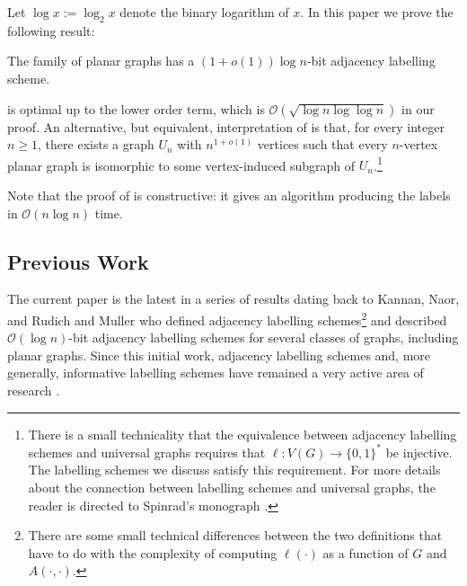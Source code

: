 \documentclass[kpfonts]{patmorin}
\newcommand{\Oh}{\mathcal{O}}
\let\ge\geqslant
\begin{document}
Let $\log x:=\log_2 x$ denote the binary logarithm of $x$.
In this paper we prove the following result:
\begin{thm}
  The family of planar graphs has a $(1+o(1))\log n$-bit adjacency labelling scheme.
\end{thm}


 is optimal up to the lower order term,
which is $\Oh\left(\sqrt{\log n\log\log n}\right)$ in our proof.
An alternative, but equivalent, interpretation of  is that, for every integer $n\ge 1$, there exists a graph $U_n$ with $n^{1+o(1)}$  vertices such that every $n$-vertex planar graph is isomorphic to some vertex-induced subgraph of $U_n$.\footnote{There is a small technicality that the equivalence between adjacency labelling schemes and universal graphs requires that $\ell:V(G)\to\{0,1\}^*$ be injective.  The labelling schemes we discuss satisfy this requirement.  For more details about the connection between labelling schemes and universal graphs, the reader is directed to Spinrad's monograph \cite[Section~2.1]{spinrad:efficient}.}

Note that the proof of  is constructive: it gives an algorithm producing the labels in $\Oh(n\log n)$ time.

\subsection{Previous Work}

The current paper is the latest in a series of results dating back to Kannan, Naor, and Rudich \cite{kannan.naor.ea:implicit0,kannan.naor.ea:implicit} and Muller \cite{muller:local} who defined adjacency labelling schemes\footnote{There are some small technical differences between the two definitions that have to do with the complexity of computing $\ell(\cdot)$ as a function of $G$ and
$A(\cdot,\cdot)$.} and described $\Oh(\log n)$-bit adjacency labelling schemes for several classes of graphs, including planar graphs.  Since this initial work, adjacency labelling schemes and, more generally, informative labelling schemes have remained a very active area of research \cite{adjiashvili.rotbart:labeling,alstrup.kaplan.ea:adjacency,abrahamsen.alstrup.ea:near-optimal,alstrup.dahlgaard.ea:sublinear,alstrup.gortz.ea:distance,alstrup.gavoille.ea:simpler,alstrup.rauhe:improved,Alon17}.
\end{document}
